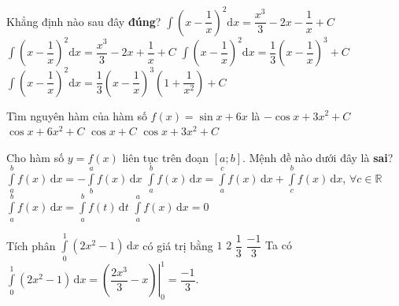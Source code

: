 \begin{ex}%
	Khẳng định nào sau đây \textbf{đúng}?
	\choice
	{\True $\displaystyle\int{\left( x-\dfrac{1}{x} \right)^2\mathrm{d}x} =\dfrac{x^3}{3}-2x-\dfrac{1}{x}+C$ }
	{ $\displaystyle\int{\left( x-\dfrac{1}{x} \right)^2\mathrm{d}x}=\dfrac{x^3}{3}-2x+\dfrac{1}{x}+C$ }
	{ $\displaystyle\int{\left( x-\dfrac{1}{x} \right)^2\mathrm{d}x} =\dfrac{1}{3}\left( x-\dfrac{1}{x} \right)^3+C$ }
	{ $\displaystyle\int{\left( x-\dfrac{1}{x} \right)^2\mathrm{d}x}=\dfrac{1}{3}\left( x-\dfrac{1}{x} \right)^3\left( 1+\dfrac{1}{x^2} \right)+C$ }
\end{ex}

\begin{ex}%
	Tìm nguyên hàm của hàm số $f(x)=\sin x +6x$ là
	\choice
	{\True $-\cos x+3x^{2}+C$}
	{$\cos x +6x^{2}+C$}
	{$\cos x +C$}
	{$\cos x +3x^{2}+C$}
\end{ex}

\begin{ex}%
	Cho hàm số $y=f(x)$ liên tục trên đoạn $[a;b]$. Mệnh đề nào dưới đây là \textbf{sai}?
	\choice
	{$\displaystyle\int\limits_a^b f(x)\mathrm{\,d} x=-\displaystyle\int\limits_b^a f(x)\mathrm{\,d}x$}
	{\True $\displaystyle\int\limits_a^b f(x)\mathrm{\,d} x=\displaystyle\int\limits_a^c f(x)\mathrm{\,d} x+\displaystyle\int\limits_c^b f(x)\mathrm{\,d}x$, $\forall c \in \mathbb{R}$}
	{$\displaystyle\int\limits_a^b f(x)\mathrm{\,d} x=\displaystyle\int\limits_a^b f(t)\mathrm{\,d}t$}
	{$\displaystyle\int\limits_a^a f(x)\mathrm{\,d}x=0$}
\end{ex}

\begin{ex}%
	Tích phân $\displaystyle\int\limits_{0}^{1}\left(2 x^{2}-1\right) \mathrm{\,d}x$ có giá trị bằng
	\choice
	{$1$}
	{$2$}
	{$\dfrac{1}{3}$}
	{\True $\dfrac{-1}{3}$}
	\loigiai
	{
	Ta có $ \displaystyle
		\int\limits_{0}^{1}\left(2 x^{2}-1\right) \mathrm{\,d}x=\left.\left(\dfrac{2 x^{3}}{3}-x\right)\right|_{0} ^{1}=\dfrac{-1}{3}
	$.
	}
\end{ex}

